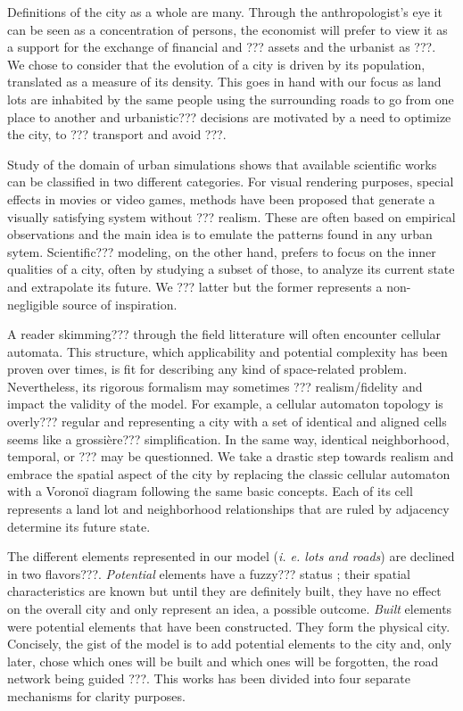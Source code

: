 \documentclass[12pt]{article}
\begin{document}
Definitions of the city as a whole are many. Through the
anthropologist's eye it can be seen as a concentration of persons, the
economist will prefer to view it as a support for the exchange of
financial and ??? assets and the urbanist as ???. We chose to consider
that the evolution of a city is driven by its population, translated
as a measure of its density. This goes in hand with our focus as land
lots are inhabited by the same people using the surrounding roads to
go from one place to another and urbanistic??? decisions are motivated
by a need to optimize the city, to ??? transport and avoid ???.

Study of the domain of urban simulations shows that available
scientific works can be classified in two different categories. For
visual rendering purposes, special effects in movies or video games,
methods have been proposed that generate a visually satisfying system
without ??? realism. These are often based on empirical observations
and the main idea is to emulate the patterns found in any urban
sytem. Scientific??? modeling, on the other hand, prefers to focus on
the inner qualities of a city, often by studying a subset of those, to
analyze its current state and extrapolate its future. We ??? latter
but the former represents a non-negligible source of inspiration.

A reader skimming??? through the field litterature will often
encounter cellular automata. This structure, which applicability and
potential complexity has been proven over times, is fit for describing
any kind of space-related problem. Nevertheless, its rigorous
formalism may sometimes ??? realism/fidelity and impact the validity
of the model. For example, a cellular automaton topology is overly???
regular and representing a city with a set of identical and aligned
cells seems like a grossière??? simplification. In the same way,
identical neighborhood, temporal, or ??? may be questionned. We take a
drastic step towards realism and embrace the spatial aspect of the
city by replacing the classic cellular automaton with a Voronoï
diagram following the same basic concepts. Each of its cell represents
a land lot and neighborhood relationships that are ruled by adjacency
determine its future state.

The different elements represented in our model (\textit{i. e. lots
  and roads}) are declined in two flavors???. \textit{Potential}
elements have a fuzzy??? status ; their spatial characteristics are
known but until they are definitely built, they have no effect on the
overall city and only represent an idea, a possible
outcome. \textit{Built} elements were potential elements that have
been constructed. They form the physical city. Concisely, the gist of
the model is to add potential elements to the city and, only later,
chose which ones will be built and which ones will be forgotten, the
road network being guided ???. This works has been divided into four
separate mechanisms for clarity purposes.
\end{document}
